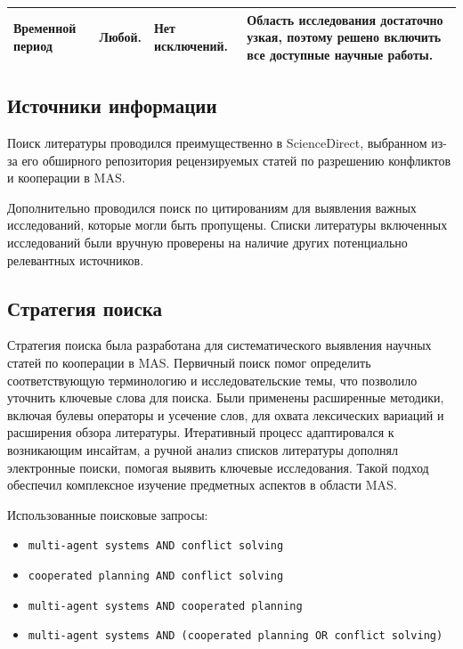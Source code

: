 \documentclass[%
]{ittmm}
\begin{document}
\begin{table}
\begin{tabularx}{\textwidth}{|X|X|X|X|}
    \hline
 Временной период & Любой.                                                                                                                                                   & Нет исключений.                                                                       & Область исследования достаточно узкая, поэтому решено включить все доступные научные работы.                              \\
    \hline
  \end{tabularx}
\end{table}

\subsection{Источники информации}

Поиск литературы проводился преимущественно в ScienceDirect,
выбранном из-за его обширного репозитория рецензируемых статей
по разрешению конфликтов и кооперации в MAS.

Дополнительно проводился поиск по цитированиям для выявления
важных исследований, которые могли быть пропущены. Списки литературы
включенных исследований были вручную проверены на наличие других
потенциально релевантных источников.

\subsection{Стратегия поиска}

Стратегия поиска была разработана для систематического выявления научных статей по кооперации в MAS.
Первичный поиск помог определить соответствующую терминологию и исследовательские темы,
что позволило уточнить ключевые слова для поиска.
Были применены расширенные методики, включая булевы операторы и усечение слов,
для охвата лексических вариаций и расширения обзора литературы.
Итеративный процесс адаптировался к возникающим инсайтам,
а ручной анализ списков литературы дополнял электронные поиски,
помогая выявить ключевые исследования.
Такой подход обеспечил комплексное изучение предметных аспектов в области MAS.

Использованные поисковые запросы:

\begin{itemize}
  \item \texttt{multi-agent systems AND conflict solving}
  \item \texttt{cooperated planning AND conflict solving}
  \item \texttt{multi-agent systems AND cooperated planning}
  \item \texttt{multi-agent systems AND (cooperated planning OR conflict solving)}
\end{itemize}
\end{document}
